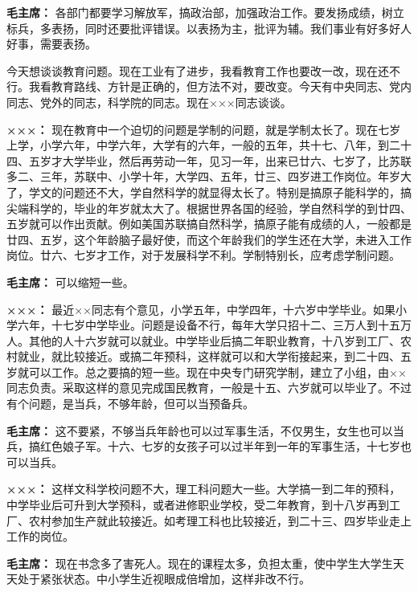 \begin{duihua}
\item[\textbf{毛主席：}] 各部门都要学习解放军，搞政治部，加强政治工作。要发扬成绩，树立标兵，多表扬，同时还要批评错误。以表扬为主，批评为辅。我们事业有好多好人好事，需要表扬。

今天想谈谈教育问题。现在工业有了进步，我看教育工作也要改一改，现在还不行。我看教育路线、方针是正确的，但方法不对，要改变。今天有中央同志、党内同志、党外的同志，科学院的同志。现在×××同志谈谈。

\item[\textbf{×××：}] 现在教育中一个迫切的问题是学制的问题，就是学制太长了。现在七岁上学，小学六年，中学六年，大学有的六年，一般的五年，共十七、八年，到二十四、五岁才大学毕业，然后再劳动一年，见习一年，出来已廿六、七岁了，比苏联多二、三年，苏联中、小学十年，大学四、五年，廿三、四岁进工作岗位。年岁大了，学文的问题还不大，学自然科学的就显得太长了。特别是搞原子能科学的，搞尖端科学的，毕业的年岁就太大了。根据世界各国的经验，学自然科学的到廿四、五岁就可以作出贡献。例如美国苏联搞自然科学，搞原子能有成绩的人，一般都是廿四、五岁，这个年龄脑子最好使，而这个年龄我们的学生还在大学，未进入工作岗位。廿六、七岁才工作，对于发展科学不利。学制特别长，应考虑学制问题。

\item[\textbf{毛主席：}] 可以缩短一些。

\item[\textbf{×××：}] 最近××同志有个意见，小学五年，中学四年，十六岁中学毕业。如果小学六年，十七岁中学毕业。问题是设备不行，每年大学只招十二、三万人到十五万人。其他的人十六岁就可以就业。中学毕业后搞二年职业教育，十八岁到工厂、农村就业，就比较接近。或搞二年预科，这样就可以和大学衔接起来，到二十四、五岁就可以工作。总之要搞的短一些。现在中央专门研究学制，建立了小组，由××同志负责。采取这样的意见完成国民教育，一般是十五、六岁就可以毕业了。不过有个问题，是当兵，不够年龄，但可以当预备兵。

\item[\textbf{毛主席：}] 这不要紧，不够当兵年龄也可以过军事生活，不仅男生，女生也可以当兵，搞红色娘子军。十六、七岁的女孩子可以过半年到一年的军事生活，十七岁也可以当兵。

\item[\textbf{×××：}] 这样文科学校问题不大，理工科问题大一些。大学搞一到二年的预科，中学毕业后可升到大学预科，或者进修职业学校，受二年教育，到十八岁再到工厂、农村参加生产就此较接近。如考理工科也比较接近，到二十三、四岁毕业走上工作的岗位。

\item[\textbf{毛主席：}] 现在书念多了害死人。现在的课程太多，负担太重，使中学生大学生天天处于紧张状态。中小学生近视眼成倍增加，这样非改不行。


\end{duihua}
